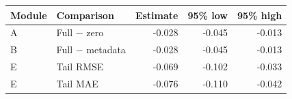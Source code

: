 \begin{tabular}{llrrr}
\toprule
Module & Comparison & Estimate & 95\% low & 95\% high \\
\midrule
A & Full $-$ zero & -0.028 & -0.045 & -0.013 \\
B & Full $-$ metadata & -0.028 & -0.045 & -0.013 \\
E & Tail RMSE & -0.069 & -0.102 & -0.033 \\
E & Tail MAE & -0.076 & -0.110 & -0.042 \\
\bottomrule
\end{tabular}

